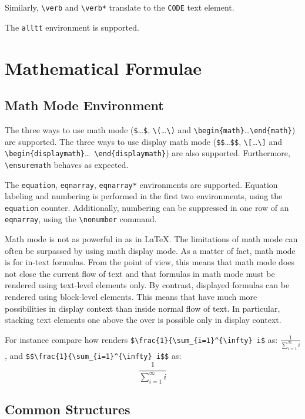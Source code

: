 Similarly, \verb+\verb+ and \verb+\verb*+ translate to the \verb+CODE+
text element.

The \verb+alltt+ environment is supported.

\section{Mathematical Formulae}

\subsection{Math Mode Environment}
The three ways to use math mode (\verb+$+\ldots\verb+$+,
\verb+\(+\ldots\verb+\)+ and
\verb+\begin{math}+\ldots\verb+\end{math}+) are supported.
The three ways to use display math mode (\verb+$$+\ldots\verb+$$+,
\verb+\[+\ldots\verb+\]+ and
\verb+\begin{displaymath}+\ldots\ \verb+\end{displaymath}+) are also
supported.
Furthermore, \verb+\ensuremath+ behaves as expected.


The \verb+equation+, \verb+eqnarray+, \verb+eqnarray*+ environments
are supported.
Equation labeling and numbering is performed in the first two
environments, using the \verb+equation+ counter.
Additionally, numbering can be suppressed in one row of an
\verb+eqnarray+, using the \verb+\nonumber+ command.


Math mode is not as powerful in \hevea{} as in \LaTeX{}.  The
limitations of math mode can often be surpassed by using math display
mode.  As a matter of fact, math mode is for in-text formulas. From
the \html{} point of view, this means that math mode does not close
the current flow of text and that formulas in math mode must be
rendered using text-level elements only.  By contrast, displayed
formulas can be rendered using block-level elements.  This means that
\hevea{} have much more possibilities in display context than inside
normal flow of text.  In particular, stacking text elements one above
the over is possible only in display context.
\begin{htmlonly}
For instance compare how \hevea{} renders
\verb+$\frac{1}{\sum_{i=1}^{\infty} i$+
as: $\frac{1}{\sum_{i=1}^{\infty} i}$, and 
\verb+$$\frac{1}{\sum_{i=1}^{\infty} i$$+ as:
$$\frac{1}{\sum_{i=1}^{\infty} i}$$
\end{htmlonly}


\subsection{Common Structures}

